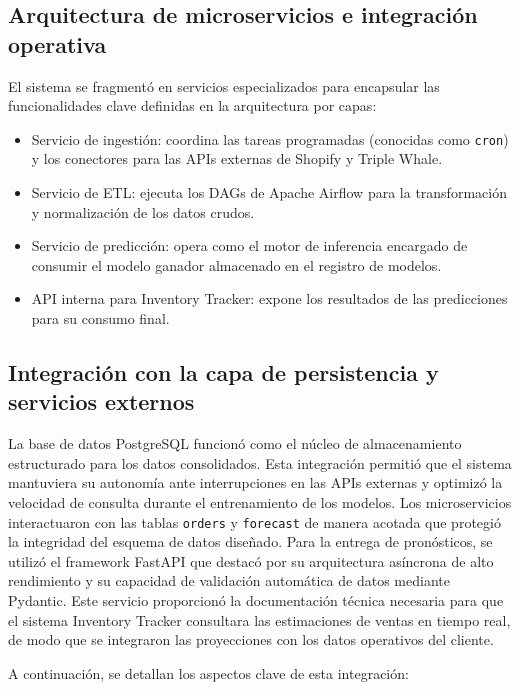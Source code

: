 \subsection{Arquitectura de microservicios e integración operativa}
El sistema se fragmentó en servicios especializados para encapsular las funcionalidades clave definidas en la arquitectura por capas:

\begin{itemize}

	\item Servicio de ingestión: coordina las tareas programadas (conocidas como \texttt{cron}) y los conectores para las APIs externas de Shopify y Triple Whale.
	\item Servicio de ETL: ejecuta los DAGs de Apache Airflow para la transformación y normalización de los datos crudos.
	\item Servicio de predicción: opera como el motor de inferencia encargado de consumir el modelo ganador almacenado en el registro de modelos.
	\item API interna para Inventory Tracker: expone los resultados de las predicciones para su consumo final.


\end{itemize}


\subsection{ Integración con la capa de persistencia y servicios externos}

La base de datos PostgreSQL funcionó como el núcleo de almacenamiento estructurado para los datos consolidados. Esta integración permitió que el sistema mantuviera su autonomía ante interrupciones en las APIs externas y optimizó la velocidad de consulta durante el entrenamiento de los modelos. Los microservicios interactuaron con las tablas \texttt{orders} y \texttt{forecast} de manera acotada que protegió la integridad del esquema de datos diseñado.
Para la entrega de pronósticos, se utilizó el framework FastAPI que destacó por su arquitectura asíncrona de alto rendimiento y su capacidad de validación automática de datos mediante Pydantic. Este servicio proporcionó la documentación técnica necesaria para que el sistema Inventory Tracker consultara las estimaciones de ventas en tiempo real, de modo que se integraron las proyecciones con los datos operativos del cliente.

A continuación, se detallan los aspectos clave de esta integración:

